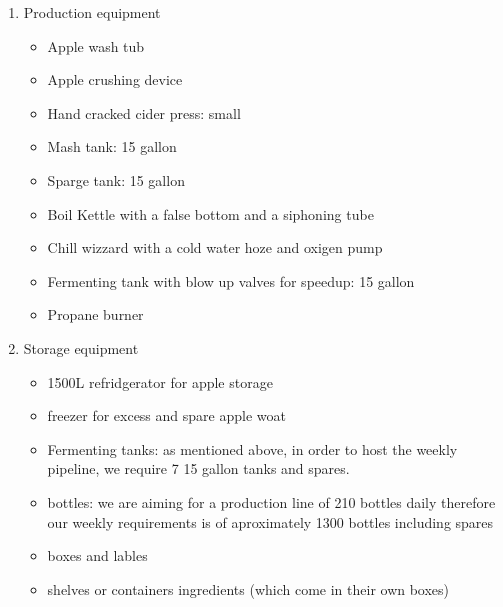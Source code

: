 \documentclass{article}
\begin{document}
    \begin{enumerate}
    \item Production equipment
      \begin{itemize}
      \item Apple wash tub
      \item Apple crushing device
      \item Hand cracked cider press: small
      \item Mash tank: 15 gallon
      \item Sparge tank: 15 gallon
      \item Boil Kettle with a false bottom and a siphoning tube
      \item Chill wizzard with a cold water hoze and oxigen pump
      \item Fermenting tank with blow up valves for speedup: 15 gallon
      \item Propane burner
      \end{itemize}

    \item Storage equipment
      \begin{itemize}
      \item 1500L refridgerator for apple storage
      \item freezer for excess and spare apple woat
      \item Fermenting tanks: as mentioned above, in order to host the weekly pipeline, we require 7 15 gallon tanks and spares.
      \item bottles: we are aiming for a production line of 210 bottles daily therefore our weekly requirements is of aproximately 1300 bottles including spares
      \item boxes and lables
      \item shelves or containers ingredients (which come in their own boxes)
      \end{itemize}


\end{enumerate}
\end{document}

